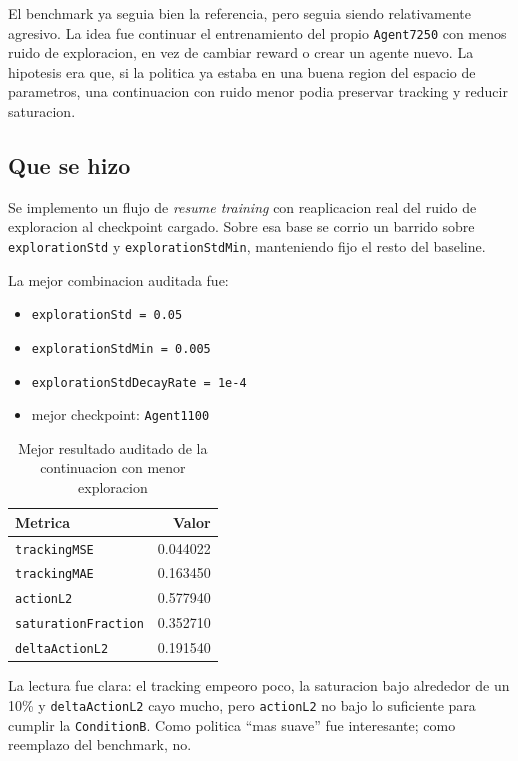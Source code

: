 \documentclass[11pt,a4paper]{article}
\begin{document}
El benchmark ya seguia bien la referencia, pero seguia siendo relativamente agresivo. La idea fue continuar el entrenamiento del propio \texttt{Agent7250} con menos ruido de exploracion, en vez de cambiar reward o crear un agente nuevo. La hipotesis era que, si la politica ya estaba en una buena region del espacio de parametros, una continuacion con ruido menor podia preservar tracking y reducir saturacion.

\subsection{Que se hizo}

Se implemento un flujo de \emph{resume training} con reaplicacion real del ruido de exploracion al checkpoint cargado. Sobre esa base se corrio un barrido sobre \texttt{explorationStd} y \texttt{explorationStdMin}, manteniendo fijo el resto del baseline.

La mejor combinacion auditada fue:

\begin{itemize}
\item \texttt{explorationStd = 0.05}
\item \texttt{explorationStdMin = 0.005}
\item \texttt{explorationStdDecayRate = 1e-4}
\item mejor checkpoint: \texttt{Agent1100}
\end{itemize}

\begin{table}[H]
\centering
\caption{Mejor resultado auditado de la continuacion con menor exploracion}
\begin{tabular}{lr}
\toprule
Metrica & Valor \\
\midrule
\texttt{trackingMSE} & 0.044022 \\
\texttt{trackingMAE} & 0.163450 \\
\texttt{actionL2} & 0.577940 \\
\texttt{saturationFraction} & 0.352710 \\
\texttt{deltaActionL2} & 0.191540 \\
\bottomrule
\end{tabular}
\end{table}

La lectura fue clara: el tracking empeoro poco, la saturacion bajo alrededor de un 10\% y \texttt{deltaActionL2} cayo mucho, pero \texttt{actionL2} no bajo lo suficiente para cumplir la \texttt{ConditionB}. Como politica ``mas suave'' fue interesante; como reemplazo del benchmark, no.
\end{document}
